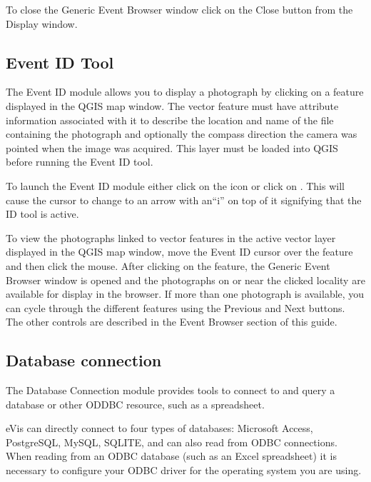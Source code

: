 To close the Generic Event Browser window click on the Close button from the Display window.

\subsection{Event ID Tool}\label{evis_id_tool}

The Event ID module allows you to display a photograph by clicking on a feature displayed in the
QGIS map window. The vector feature must have attribute information associated with it to describe
the location and name of the file containing the photograph and optionally the compass direction the
camera was pointed when the image was acquired. This layer must be loaded into QGIS before running
the Event ID tool.

\label{evis_launch_id}

To launch the Event ID module either click on the 
icon or click on  \arrow {} \arrow
{}. This will cause the cursor to change to an arrow with an``i'' on top of
it signifying that the ID tool is active.

To view the photographs linked to vector features in the active vector layer displayed in the QGIS
map window, move the Event ID cursor over the feature and then click the mouse. After clicking on
the feature, the Generic Event Browser window is opened and the photographs on or near the clicked
locality are available for display in the browser. If more than one photograph is available, you can
cycle through the different features using the Previous and Next buttons. The other controls are
described in the Event Browser section of this guide.

\subsection{Database connection}\label{evis_database}

The Database Connection module provides tools to connect to and query a database or other ODDBC
resource, such as a spreadsheet.

eVis can directly connect to four types of databases: Microsoft Access, PostgreSQL, MySQL, SQLITE,
and can also read from ODBC connections. When reading from an ODBC database (such as an Excel
spreadsheet) it is necessary to configure your ODBC driver for the operating system you are using.

